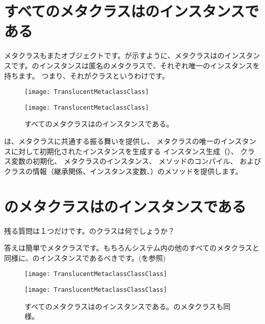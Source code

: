 \documentclass[a4paper,10pt,twoside]{book}
\begin{document}
\section{すべてのメタクラスはのインスタンスである}

メタクラスもまたオブジェクトです。が示すように、メタクラスはのインスタンスです。のインスタンスは匿名のメタクラスで、それぞれ唯一のインスタンスを持ちます。
つまり、それがクラスというわけです。

\begin{center}
\begin{figure}
\ifluluelse
	{\centerline{\texttt{[image: TranslucentMetaclassClass]}}}
	{\centerline{\texttt{[image: TranslucentMetaclassClass]}}}
\caption{すべてのメタクラスはのインスタンスである。}
\end{figure}
\end{center}

は、メタクラスに共通する振る舞いを提供し、
メタクラスの唯一のインスタンスに対して初期化されたインスタンスを生成する
インスタンス生成（）、
クラス変数の初期化、
メタクラスのインスタンス、
メソッドのコンパイル、%
およびクラスの情報（継承関係、インスタンス変数、\etc）のメソッドを提供します。

\section{のメタクラスはのインスタンスである}

残る質問は１つだけです。のクラスは何でしょうか？

答えは簡単でメタクラスです。もちろんシステム内の他のすべてのメタクラスと同様に、のインスタンスであるべきです。(を参照)

\begin{center}
\begin{figure}
\ifluluelse
	{\centerline{\texttt{[image: TranslucentMetaclassClassClass]}}}
	{\centerline{\texttt{[image: TranslucentMetaclassClassClass]}}}
\caption{すべてのメタクラスはのインスタンスである。のメタクラスも同様。}
\end{figure}
\end{center}
\end{document}
